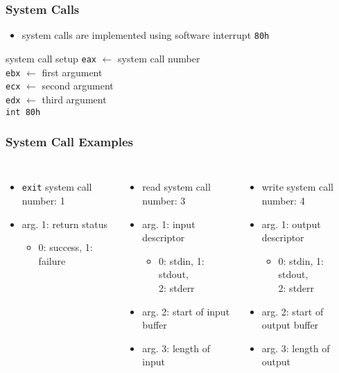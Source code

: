 \documentclass[dvipsnames]{beamer}
\begin{document}
\begin{frame}
  \frametitle{System Calls}

  \begin{itemize}
    \item system calls are implemented using software interrupt \texttt{80h}
  \end{itemize}

  \bigskip
  \begin{block}{system call setup}
    \texttt{eax} $\leftarrow$ system call number\\
    \texttt{ebx} $\leftarrow$ first argument\\
    \texttt{ecx} $\leftarrow$ second argument\\
    \texttt{edx} $\leftarrow$ third argument\\
    \lstinline|int 80h|
  \end{block}
\end{frame}

\begin{frame}
  \frametitle{System Call Examples}

  \begin{columns}[b]
    \begin{itemize}
      \item \lstinline{exit} system call number: 1
      \item arg. 1: return status
      \begin{itemize}
        \item 0: success, 1: failure
      \end{itemize}
    \end{itemize}

    \pause
    \bigskip
    \begin{itemize}
      \item read system call number: 3
      \item arg. 1: input descriptor
      \begin{itemize}
        \item 0: stdin, 1: stdout,\\
          2: stderr
      \end{itemize}
      \item arg. 2: start of input buffer
      \item arg. 3: length of input
    \end{itemize}

    \pause
    \begin{itemize}
      \item write system call number: 4
      \item arg. 1: output descriptor
      \begin{itemize}
        \item 0: stdin, 1: stdout,\\
          2: stderr
      \end{itemize}
      \item arg. 2: start of output buffer
      \item arg. 3: length of output
    \end{itemize}
  \end{columns}
\end{frame}
\end{document}
